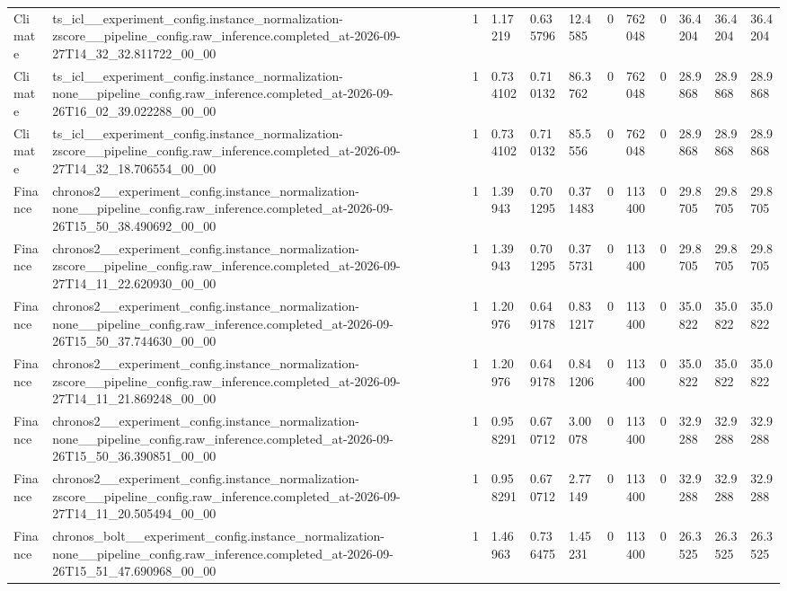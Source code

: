 \begin{tabular}{llllllllllll}
Climate & ts\_icl\_\_experiment\_config.instance\_normalization-zscore\_\_pipeline\_config.raw\_inference.completed\_at-2026-09-27T14\_32\_32.811722\_00\_00 & 1 & 1.17219 & 0.635796 & 12.4585 & 0 & 762048 & 0 & 36.4204 & 36.4204 & 36.4204 \\
Climate & ts\_icl\_\_experiment\_config.instance\_normalization-none\_\_pipeline\_config.raw\_inference.completed\_at-2026-09-26T16\_02\_39.022288\_00\_00 & 1 & 0.734102 & 0.710132 & 86.3762 & 0 & 762048 & 0 & 28.9868 & 28.9868 & 28.9868 \\
Climate & ts\_icl\_\_experiment\_config.instance\_normalization-zscore\_\_pipeline\_config.raw\_inference.completed\_at-2026-09-27T14\_32\_18.706554\_00\_00 & 1 & 0.734102 & 0.710132 & 85.5556 & 0 & 762048 & 0 & 28.9868 & 28.9868 & 28.9868 \\
Finance & chronos2\_\_experiment\_config.instance\_normalization-none\_\_pipeline\_config.raw\_inference.completed\_at-2026-09-26T15\_50\_38.490692\_00\_00 & 1 & 1.39943 & 0.701295 & 0.371483 & 0 & 113400 & 0 & 29.8705 & 29.8705 & 29.8705 \\
Finance & chronos2\_\_experiment\_config.instance\_normalization-zscore\_\_pipeline\_config.raw\_inference.completed\_at-2026-09-27T14\_11\_22.620930\_00\_00 & 1 & 1.39943 & 0.701295 & 0.375731 & 0 & 113400 & 0 & 29.8705 & 29.8705 & 29.8705 \\
Finance & chronos2\_\_experiment\_config.instance\_normalization-none\_\_pipeline\_config.raw\_inference.completed\_at-2026-09-26T15\_50\_37.744630\_00\_00 & 1 & 1.20976 & 0.649178 & 0.831217 & 0 & 113400 & 0 & 35.0822 & 35.0822 & 35.0822 \\
Finance & chronos2\_\_experiment\_config.instance\_normalization-zscore\_\_pipeline\_config.raw\_inference.completed\_at-2026-09-27T14\_11\_21.869248\_00\_00 & 1 & 1.20976 & 0.649178 & 0.841206 & 0 & 113400 & 0 & 35.0822 & 35.0822 & 35.0822 \\
Finance & chronos2\_\_experiment\_config.instance\_normalization-none\_\_pipeline\_config.raw\_inference.completed\_at-2026-09-26T15\_50\_36.390851\_00\_00 & 1 & 0.958291 & 0.670712 & 3.00078 & 0 & 113400 & 0 & 32.9288 & 32.9288 & 32.9288 \\
Finance & chronos2\_\_experiment\_config.instance\_normalization-zscore\_\_pipeline\_config.raw\_inference.completed\_at-2026-09-27T14\_11\_20.505494\_00\_00 & 1 & 0.958291 & 0.670712 & 2.77149 & 0 & 113400 & 0 & 32.9288 & 32.9288 & 32.9288 \\
Finance & chronos\_bolt\_\_experiment\_config.instance\_normalization-none\_\_pipeline\_config.raw\_inference.completed\_at-2026-09-26T15\_51\_47.690968\_00\_00 & 1 & 1.46963 & 0.736475 & 1.45231 & 0 & 113400 & 0 & 26.3525 & 26.3525 & 26.3525 \\

\end{tabular}
